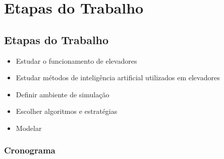 \chapter{\label{chap:stages}Etapas do Trabalho}

\section{Etapas do Trabalho}

\begin{itemize}
    \item Estudar o funcionamento de elevadores
    \item Estudar métodos de inteligência artificial utilizados em elevadores
    \item Definir ambiente de simulação
    \item Escolher algoritmos e estratégias
    \item Modelar 
\end{itemize}

\subsection{Cronograma}